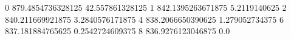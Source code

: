 0 879.4854736328125 42.557861328125
1 842.1395263671875 5.2119140625
2 840.211669921875 3.2840576171875
4 838.2066650390625 1.279052734375
6 837.181884765625 0.2542724609375
8 836.9276123046875 0.0
